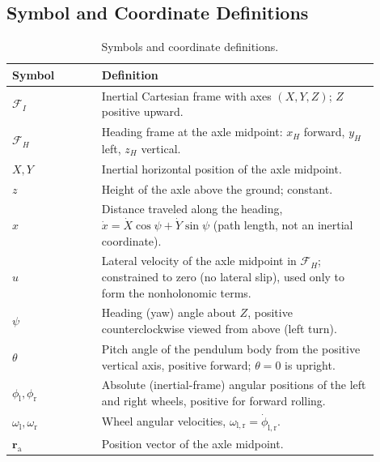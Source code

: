\documentclass[journal]{IEEEtran}
\begin{document}
\subsection{Symbol and Coordinate Definitions}

\begin{table}[H]
\centering
\caption{Symbols and coordinate definitions.}
\label{tab:symbol_definitions}
\renewcommand{\arraystretch}{1.1}
\begin{tabular}{
    >{\raggedright\arraybackslash}p{0.22\linewidth}
    >{\raggedright\arraybackslash}p{0.68\linewidth}
}
\toprule
Symbol & Definition \\
\midrule

$\mathcal{F}_I$
& Inertial Cartesian frame with axes $(X,Y,Z)$; $Z$ positive upward. \\

$\mathcal{F}_H$
& Heading frame at the axle midpoint: $x_H$ forward, $y_H$ left,
$z_H$ vertical. \\

$X,Y$
& Inertial horizontal position of the axle midpoint. \\

$z$
& Height of the axle above the ground; constant. \\

$x$
& Distance traveled along the heading, $\dot{x}=\dot{X}\cos\psi+\dot{Y}\sin\psi$
(path length, not an inertial coordinate). \\

$u$
& Lateral velocity of the axle midpoint in $\mathcal{F}_H$; constrained to
zero (no lateral slip), used only to form the nonholonomic terms. \\

$\psi$
& Heading (yaw) angle about $Z$, positive counterclockwise viewed from
above (left turn). \\

$\theta$
& Pitch angle of the pendulum body from the positive vertical axis, positive
forward; $\theta=0$ is upright. \\

$\phi_{\mathrm l},\phi_{\mathrm r}$
& Absolute (inertial-frame) angular positions of the left and right wheels,
positive for forward rolling. \\

$\omega_{\mathrm l},\omega_{\mathrm r}$
& Wheel angular velocities, $\omega_{\mathrm{l,r}}=\dot{\phi}_{\mathrm{l,r}}$. \\

$\bm r_{\mathrm a}$
& Position vector of the axle midpoint. \\


\end{tabular}
\end{table}
\end{document}
